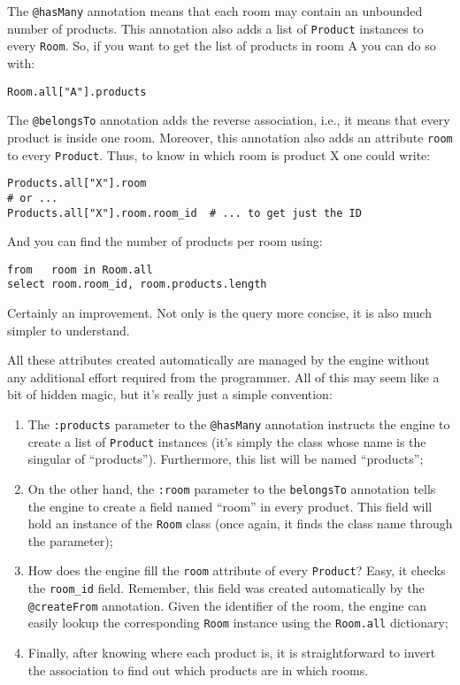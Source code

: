 \documentclass{report}
\begin{document}
The \verb=@hasMany= annotation means that each room may contain an
unbounded number of products. This annotation also adds a list of
\verb=Product= instances to every \verb=Room=. So, if you want to get
the list of products in room A you can do so with:

\begin{verbatim}
Room.all["A"].products
\end{verbatim}

The \verb=@belongsTo= annotation adds the reverse association, i.e.,
it means that every product is inside one room. Moreover, this
annotation also adds an attribute \verb=room= to every
\verb=Product=. Thus, to know in which room is product X one could
write:

\begin{verbatim}
Products.all["X"].room
# or ...
Products.all["X"].room.room_id  # ... to get just the ID
\end{verbatim}

And you can find the number of products per room using:

\begin{verbatim}
from   room in Room.all
select room.room_id, room.products.length
\end{verbatim}

Certainly an improvement. Not only is the query more concise, it is
also much simpler to understand.

All these attributes created automatically are managed by the engine
without any additional effort required from the programmer. All of
this may seem like a bit of hidden magic, but it's really just a
simple convention:

\begin{enumerate}
\item The \verb=:products= parameter to the \verb=@hasMany= annotation
  instructs the engine to create a list of \verb=Product= instances
  (it's simply the class whose name is the singular of
  ``products''). Furthermore, this list will be named ``products'';
\item On the other hand, the \verb=:room= parameter to the
  \verb=belongsTo= annotation tells the engine to create a field named
  ``room'' in every product. This field will hold an instance of the
  \verb=Room= class (once again, it finds the class name through the
  parameter);
\item How does the engine fill the \verb=room= attribute of every
  \verb=Product=? Easy, it checks the \verb=room_id= field. Remember,
  this field was created automatically by the \verb=@createFrom=
  annotation. Given the identifier of the room, the engine can easily
  lookup the corresponding \verb=Room= instance using the
  \verb=Room.all= dictionary;
\item Finally, after knowing where each product is, it is
  straightforward to invert the association to find out which products
  are in which rooms.
\end{enumerate}
\end{document}
